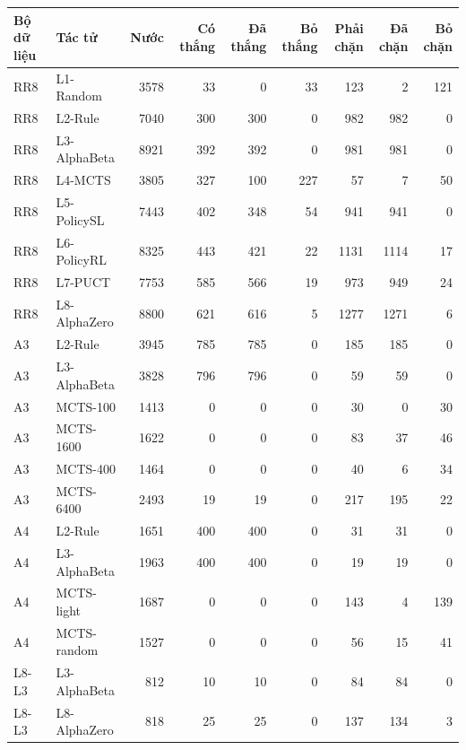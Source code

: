 \begin{center}\small
\begin{tabular}{@{}llrrrrrrr@{}}
\toprule
Bộ dữ liệu & Tác tử & Nước & Có thắng & Đã thắng & Bỏ thắng & Phải chặn & Đã chặn & Bỏ chặn \\
\midrule
RR8 & L1-Random & 3578 & 33 & 0 & 33 & 123 & 2 & 121 \\
RR8 & L2-Rule & 7040 & 300 & 300 & 0 & 982 & 982 & 0 \\
RR8 & L3-AlphaBeta & 8921 & 392 & 392 & 0 & 981 & 981 & 0 \\
RR8 & L4-MCTS & 3805 & 327 & 100 & 227 & 57 & 7 & 50 \\
RR8 & L5-PolicySL & 7443 & 402 & 348 & 54 & 941 & 941 & 0 \\
RR8 & L6-PolicyRL & 8325 & 443 & 421 & 22 & 1131 & 1114 & 17 \\
RR8 & L7-PUCT & 7753 & 585 & 566 & 19 & 973 & 949 & 24 \\
RR8 & L8-AlphaZero & 8800 & 621 & 616 & 5 & 1277 & 1271 & 6 \\
A3 & L2-Rule & 3945 & 785 & 785 & 0 & 185 & 185 & 0 \\
A3 & L3-AlphaBeta & 3828 & 796 & 796 & 0 & 59 & 59 & 0 \\
A3 & MCTS-100 & 1413 & 0 & 0 & 0 & 30 & 0 & 30 \\
A3 & MCTS-1600 & 1622 & 0 & 0 & 0 & 83 & 37 & 46 \\
A3 & MCTS-400 & 1464 & 0 & 0 & 0 & 40 & 6 & 34 \\
A3 & MCTS-6400 & 2493 & 19 & 19 & 0 & 217 & 195 & 22 \\
A4 & L2-Rule & 1651 & 400 & 400 & 0 & 31 & 31 & 0 \\
A4 & L3-AlphaBeta & 1963 & 400 & 400 & 0 & 19 & 19 & 0 \\
A4 & MCTS-light & 1687 & 0 & 0 & 0 & 143 & 4 & 139 \\
A4 & MCTS-random & 1527 & 0 & 0 & 0 & 56 & 15 & 41 \\
L8-L3 & L3-AlphaBeta & 812 & 10 & 10 & 0 & 84 & 84 & 0 \\
L8-L3 & L8-AlphaZero & 818 & 25 & 25 & 0 & 137 & 134 & 3 \\
\bottomrule
\end{tabular}
\end{center}